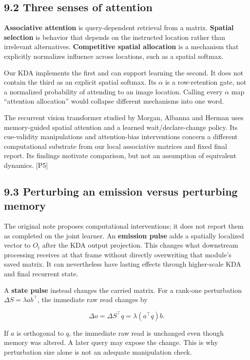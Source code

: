 \documentclass[
  11pt,
]{article}
\let\oldsubsection\subsection
\renewcommand{\subsection}{\Needspace{6\baselineskip}\oldsubsection}
\begin{document}
\subsection{9.2 Three senses of
attention}\label{three-senses-of-attention}

\textbf{Associative attention} is query-dependent retrieval from a
matrix. \textbf{Spatial selection} is behavior that depends on the
instructed location rather than irrelevant alternatives.
\textbf{Competitive spatial allocation} is a mechanism that explicitly
normalizes influence across locations, such as a spatial softmax.

Our KDA implements the first and can support learning the second. It
does not contain the third as an explicit spatial softmax. Its
\(\alpha\) is a row-retention gate, not a normalized probability of
attending to an image location. Calling every \(\alpha\) map ``attention
allocation'' would collapse different mechanisms into one word.

The recurrent vision transformer studied by Morgan, Albanna and Herman
uses memory-guided spatial attention and a learned wait/declare-change
policy. Its cue-validity manipulations and attention-bias interventions
concern a different computational substrate from our local associative
matrices and fixed final report. Its findings motivate comparison, but
not an assumption of equivalent dynamics. {[}P5{]}

\subsection{9.3 Perturbing an emission versus perturbing
memory}\label{perturbing-an-emission-versus-perturbing-memory}

The original note proposes computational interventions; it does not
report them as completed on the joint learner. An \textbf{emission
pulse} adds a spatially localized vector to \(O_t\) after the KDA output
projection. This changes what downstream processing receives at that
frame without directly overwriting that module's saved matrix. It can
nevertheless have lasting effects through higher-scale KDA and final
recurrent state.

A \textbf{state pulse} instead changes the carried matrix. For a
rank-one perturbation \(\Delta S=\lambda ab^\top\), the immediate raw
read changes by

\[\Delta o=\Delta S^\top q=\lambda(a^\top q)b.\]

If \(a\) is orthogonal to \(q\), the immediate raw read is unchanged
even though memory was altered. A later query may expose the change.
This is why perturbation size alone is not an adequate manipulation
check.
\end{document}
